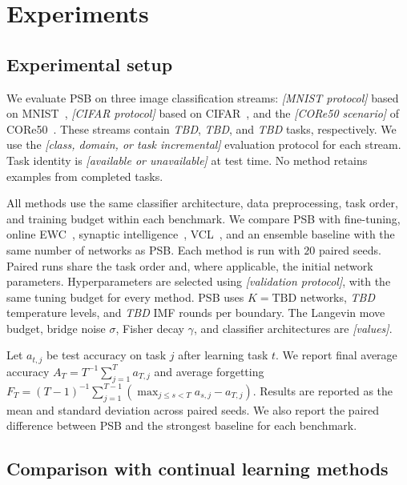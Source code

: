 \section{Experiments}
\label{sec:experiments}

\subsection{Experimental setup}

We evaluate PSB on three image classification streams: \emph{[MNIST
protocol]} based on MNIST~\cite{lecun1998gradient}, \emph{[CIFAR
protocol]} based on CIFAR~\cite{krizhevsky2009learning}, and the
\emph{[CORe50 scenario]} of CORe50~\cite{lomonaco2017core50}. These
streams contain \textit{TBD}, \textit{TBD}, and \textit{TBD} tasks,
respectively. We use the \emph{[class, domain, or task incremental]}
evaluation protocol for each stream. Task identity is
\emph{[available or unavailable]} at test time. No method retains
examples from completed tasks.

All methods use the same classifier architecture, data preprocessing,
task order, and training budget within each benchmark. We compare PSB
with fine-tuning, online EWC~\cite{schwarz2018progress}, synaptic
intelligence~\cite{zenke2017si}, VCL~\cite{nguyen2018vcl}, and an
ensemble baseline with the same number of networks as PSB. Each method
is run with $20$ paired seeds. Paired runs share the task order and,
where applicable, the initial network parameters. Hyperparameters are
selected using \emph{[validation protocol]}, with the same tuning
budget for every method. PSB uses $K=\mathrm{TBD}$ networks,
\textit{TBD} temperature levels, and \textit{TBD} IMF rounds per
boundary. The Langevin move budget, bridge noise $\sigma$, Fisher decay
$\gamma$, and classifier architectures are \emph{[values]}.

Let $a_{t,j}$ be test accuracy on task $j$ after learning task $t$.
We report final average accuracy
$A_T=T^{-1}\sum_{j=1}^{T}a_{T,j}$ and average forgetting
$F_T=(T-1)^{-1}\sum_{j=1}^{T-1}
(\max_{j\leq s<T}a_{s,j}-a_{T,j})$.
Results are reported as the mean and standard deviation across paired
seeds. We also report the paired difference between PSB and the
strongest baseline for each benchmark.

\subsection{Comparison with continual learning methods}

